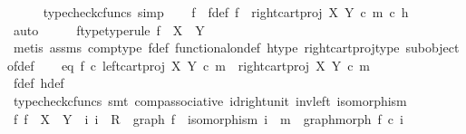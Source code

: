 \begin{isabellebody}
\ \ \ \ \isamarkupfalse%
\ {\isacharparenleft}{\kern0pt}typecheck{\isacharunderscore}{\kern0pt}cfuncs{\isacharcomma}{\kern0pt}\ simp{\isacharparenright}{\kern0pt}\isanewline
\ \ \isamarkupfalse%
\ f\ \ f{\isacharunderscore}{\kern0pt}def{\isacharcolon}{\kern0pt}\ {\isachardoublequoteopen}f\ {\isacharequal}{\kern0pt}\ {\isacharparenleft}{\kern0pt}right{\isacharunderscore}{\kern0pt}cart{\isacharunderscore}{\kern0pt}proj\ X\ Y{\isacharparenright}{\kern0pt}\ {\isasymcirc}\isactrlsub c\ m\ {\isasymcirc}\isactrlsub c\ h{\isachardoublequoteclose}\isanewline
\ \ \ \ \isamarkupfalse%
\ auto\isanewline
\ \ \isamarkupfalse%
\ \isamarkupfalse%
\ f{\isacharunderscore}{\kern0pt}type{\isacharbrackleft}{\kern0pt}type{\isacharunderscore}{\kern0pt}rule{\isacharbrackright}{\kern0pt}{\isacharcolon}{\kern0pt}\ {\isachardoublequoteopen}f\ {\isacharcolon}{\kern0pt}\ X\ {\isasymrightarrow}\ Y{\isachardoublequoteclose}\isanewline
\ \ \ \ \isamarkupfalse%
\ {\isacharparenleft}{\kern0pt}metis\ assms\ comp{\isacharunderscore}{\kern0pt}type\ f{\isacharunderscore}{\kern0pt}def\ functional{\isacharunderscore}{\kern0pt}on{\isacharunderscore}{\kern0pt}def\ h{\isacharunderscore}{\kern0pt}type\ right{\isacharunderscore}{\kern0pt}cart{\isacharunderscore}{\kern0pt}proj{\isacharunderscore}{\kern0pt}type\ subobject{\isacharunderscore}{\kern0pt}of{\isacharunderscore}{\kern0pt}def{}{\isacharparenright}{\kern0pt}\isanewline
\isanewline
\ \ \isamarkupfalse%
\ eq{\isacharcolon}{\kern0pt}\ {\isachardoublequoteopen}f\ {\isasymcirc}\isactrlsub c\ left{\isacharunderscore}{\kern0pt}cart{\isacharunderscore}{\kern0pt}proj\ X\ Y\ {\isasymcirc}\isactrlsub c\ m\ {\isacharequal}{\kern0pt}\ right{\isacharunderscore}{\kern0pt}cart{\isacharunderscore}{\kern0pt}proj\ X\ Y\ {\isasymcirc}\isactrlsub c\ m{\isachardoublequoteclose}\isanewline
\ \ \ \ \isamarkupfalse%
\ f{\isacharunderscore}{\kern0pt}def\ h{\isacharunderscore}{\kern0pt}def\ \isamarkupfalse%
\ {\isacharparenleft}{\kern0pt}typecheck{\isacharunderscore}{\kern0pt}cfuncs{\isacharcomma}{\kern0pt}\ smt\ comp{\isacharunderscore}{\kern0pt}associative{}\ id{\isacharunderscore}{\kern0pt}right{\isacharunderscore}{\kern0pt}unit{}\ inv{\isacharunderscore}{\kern0pt}left\ isomorphism{\isacharparenright}{\kern0pt}\isanewline
\isanewline
\ \ \isamarkupfalse%
\ {\isachardoublequoteopen}{\isasymexists}f{\isachardot}{\kern0pt}\ f\ {\isacharcolon}{\kern0pt}\ X\ {\isasymrightarrow}\ Y\ {\isasymand}\ {\isacharparenleft}{\kern0pt}{\isasymexists}i{\isachardot}{\kern0pt}\ i\ {\isacharcolon}{\kern0pt}\ R\ {\isasymrightarrow}\ graph\ f\ {\isasymand}\ isomorphism\ i\ {\isasymand}\ m\ {\isacharequal}{\kern0pt}\ graph{\isacharunderscore}{\kern0pt}morph\ f\ {\isasymcirc}\isactrlsub c\ i{\isacharparenright}{\kern0pt}{\isachardoublequoteclose}\isanewline

\end{isabellebody}
